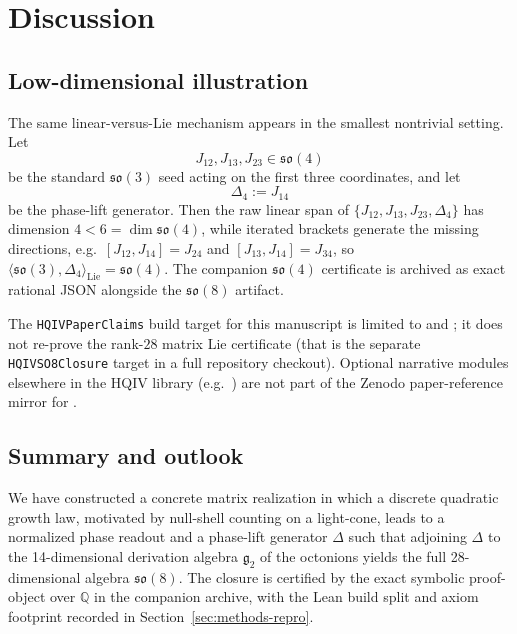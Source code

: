 \documentclass[11pt]{amsart}
\begin{document}
\section{Discussion}\label{sec:discussion}

\subsection{Low-dimensional illustration}

The same linear-versus-Lie mechanism appears in the smallest nontrivial setting. Let
\[
J_{12},J_{13},J_{23}\in\mathfrak{so}(4)
\]
be the standard \(\mathfrak{so}(3)\) seed acting on the first three coordinates, and let
\[
\Delta_4:=J_{14}
\]
be the phase-lift generator. Then the raw linear span of \(\{J_{12},J_{13},J_{23},\Delta_4\}\) has dimension \(4<6=\dim\mathfrak{so}(4)\), while iterated brackets generate the missing directions, e.g.\ \([J_{12},J_{14}]=J_{24}\) and \([J_{13},J_{14}]=J_{34}\), so \(\langle\mathfrak{so}(3),\Delta_4\rangle_{\mathrm{Lie}}=\mathfrak{so}(4)\). The companion \(\mathfrak{so}(4)\) certificate is archived as exact rational JSON alongside the \(\mathfrak{so}(8)\) artifact.

\begin{sloppypar}
The \texttt{HQIVPaperClaims} build target for this manuscript is limited to  and ; it does not re-prove the rank-\(28\) matrix Lie certificate (that is the separate \texttt{HQIVSO8Closure} target in a full repository checkout). Optional narrative modules elsewhere in the HQIV library (e.g.\ ) are not part of the Zenodo paper-reference mirror for .
\end{sloppypar}

\subsection{Summary and outlook}

We have constructed a concrete matrix realization in which a discrete quadratic growth law, motivated by null-shell counting on a light-cone, leads to a normalized phase readout and a phase-lift generator \(\Delta\) such that adjoining \(\Delta\) to the 14-dimensional derivation algebra \(\mathfrak{g}_2\) of the octonions yields the full 28-dimensional algebra \(\mathfrak{so}(8)\). The closure is certified by the exact symbolic proof-object over \(\mathbb{Q}\) in the companion archive, with the Lean build split and axiom footprint recorded in Section~\ref{sec:methods-repro}.
\end{document}
